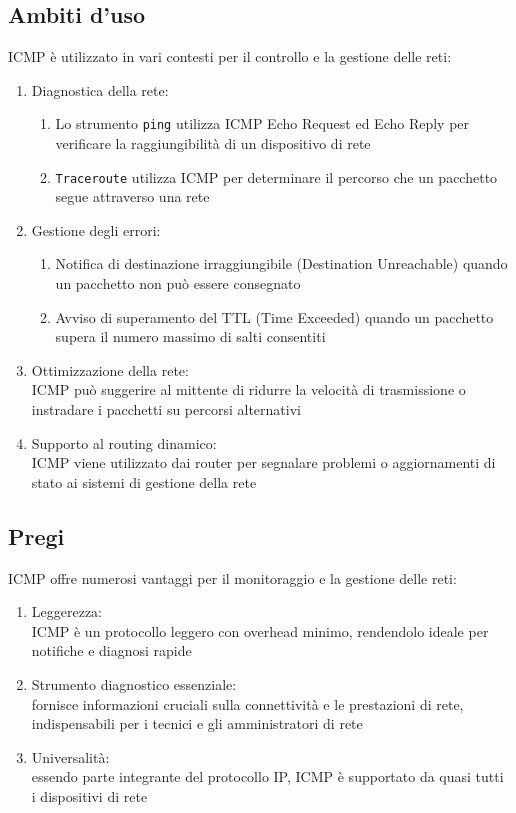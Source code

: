 \documentclass[10pt,oneside,a4paper]{article}
\begin{document}
\subsection{Ambiti d'uso}
ICMP è utilizzato in vari contesti per il controllo e la gestione delle reti:
\begin{enumerate}
\item Diagnostica della rete:
\begin{enumerate}
\item Lo strumento \texttt{ping} utilizza ICMP Echo Request ed Echo Reply per verificare la raggiungibilità di un dispositivo di rete
\item \texttt{Traceroute} utilizza ICMP per determinare il percorso che un pacchetto segue attraverso una rete
\end{enumerate}
\item Gestione degli errori:
\begin{enumerate}
\item Notifica di destinazione irraggiungibile (Destination Unreachable) quando un pacchetto non può essere consegnato
\item Avviso di superamento del TTL (Time Exceeded) quando un pacchetto supera il numero massimo di salti consentiti
\end{enumerate}
\item Ottimizzazione della rete:\\
ICMP può suggerire al mittente di ridurre la velocità di trasmissione o instradare i pacchetti su percorsi alternativi
\item Supporto al routing dinamico:\\
ICMP viene utilizzato dai router per segnalare problemi o aggiornamenti di stato ai sistemi di gestione della rete
\end{enumerate}
\subsection{Pregi}
ICMP offre numerosi vantaggi per il monitoraggio e la gestione delle reti:
\begin{enumerate}
\item Leggerezza:\\
ICMP è un protocollo leggero con overhead minimo, rendendolo ideale per notifiche e diagnosi rapide
\item Strumento diagnostico essenziale:\\
fornisce informazioni cruciali sulla connettività e le prestazioni di rete, indispensabili per i tecnici e gli amministratori di rete
\item Universalità:\\
essendo parte integrante del protocollo IP, ICMP è supportato da quasi tutti i dispositivi di rete
\end{enumerate}
\end{document}
